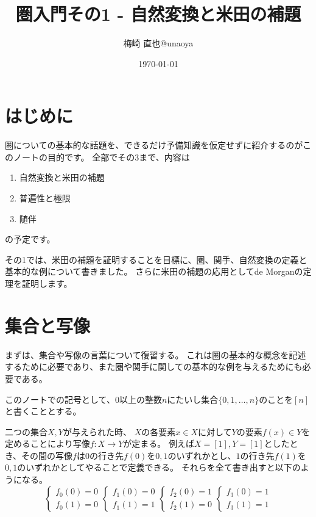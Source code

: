 \documentclass[uplatex]{jsarticle}
\title{圏入門その1 - 自然変換と米田の補題}
\author{梅崎 直也@unaoya}
\date{\today}
\begin{document}
\maketitle

\section{はじめに}

圏についての基本的な話題を、できるだけ予備知識を仮定せずに紹介するのがこのノートの目的です。
全部でその3まで、内容は
\begin{enumerate}
\item 自然変換と米田の補題
\item 普遍性と極限
\item 随伴
\end{enumerate}
の予定です。

その1では、米田の補題を証明することを目標に、圏、関手、自然変換の定義と基本的な例について書きました。
さらに米田の補題の応用としてde Morganの定理を証明します。

\section{集合と写像}
まずは、集合や写像の言葉について復習する。
これは圏の基本的な概念を記述するために必要であり、また圏や関手に関しての基本的な例を与えるためにも必要である。

\begin{dfn}
このノートでの記号として、$0$以上の整数$n$にたいし集合$\{0,1,\ldots,n\}$のことを$[n]$と書くこととする。
\end{dfn}

二つの集合$X,Y$が与えられた時、
$X$の各要素$x\in X$に対して$Y$の要素$f(x)\in Y$を定めることにより写像$f\colon X\to Y$が定まる。
例えば$X=[1], Y=[1]$としたとき、その間の写像$f$は$0$の行き先$f(0)$を$0, 1$のいずれかとし、$1$の行き先$f(1)$を$0,1$のいずれかとしてやることで定義できる。
それらを全て書き出すと以下のようになる。
\[
\begin{cases}f_0(0)=0\\f_0(1)=0\end{cases}
\begin{cases}f_1(0)=0\\f_1(1)=1\end{cases}
\begin{cases}f_2(0)=1\\f_2(1)=0\end{cases}
\begin{cases}f_3(0)=1\\f_3(1)=1\end{cases}
\]
\end{document}
